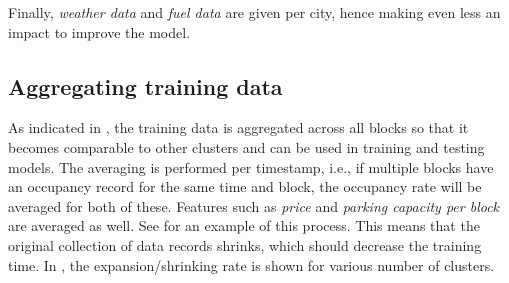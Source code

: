 Finally, \textit{weather data} and \textit{fuel data} are given per city, hence making even less an impact to improve the model.  

\subsection{Aggregating training data}
\label{experimental_setup:aggregating_training_data}
As indicated in , the training data is aggregated across all blocks so that it becomes comparable to other clusters and can be used in training and testing models. The averaging is performed per timestamp, i.e., if multiple blocks have an occupancy record for the same time and block, the occupancy rate will be averaged for both of these. Features such as \textit{price} and \textit{parking capacity per block} are averaged as well. See  for an example of this process. This means that the original collection of data records shrinks, which should decrease the training time. In , the expansion/shrinking rate is shown for various number of clusters.

